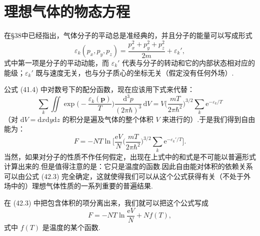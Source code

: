 \section{理想气体的物态方程}

在§38中已经指出，气体分子的平动总是准经典的，并且分子的能量可以写成形式
\begin{equation}
  \varepsilon_k(p_x,p_y,p_z)=\frac{p_x^2+p_y^2+p_z^2}{2m}+\varepsilon_k',
\end{equation}
式中第一项是分子的平动动能，而 $\varepsilon_k'$ 代表与分子的转动和它的内部状态相对应的能级；$\varepsilon_k'$ 既与速度无关，也与分子质心的坐标无关（假定没有任何外场）.

公式 (41.4) 中对数号下的配分函数，现在应该用下式来代替：
\begin{equation}
  \sum_k\iint\exp\Big(-\frac{\varepsilon_k(\boldsymbol{p})}{T}\Big)
  \frac{\mathrm{d}^3p}{(2\pi\hbar)^3}\,\mathrm{d}V
  =V\Big(\frac{mT}{2\pi\hbar^2}\Big)^{3/2}\sum_k\mathrm{e}^{-\varepsilon_k/T}
\end{equation}
（对 $\mathrm{d}V=\mathrm{d}x\mathrm{d}y\mathrm{d}z$ 的积分是遍及气体的整个体积 $V$ 来进行的）.于是我们得到自由能为：
\begin{equation}
  F=-NT\ln\Big[\frac{\mathrm{e}V}{N}\Big(\frac{mT}{2\pi\hbar^2}\Big)^{3/2}
  \sum_k\mathrm{e}^{-\varepsilon_k'/T}\Big].
\end{equation}
当然，如果对分子的性质不作任何假定，出现在上式中的和式是不可能以普遍形式计算出来的.但是值得注意的是：它只是温度的函数.因此自由能对体积的依赖关系可以由公式 (42.3) 完全确定，这就使得我们可以从这个公式获得有关（不处于外场中的）理想气体性质的一系列重要的普遍结果.

在 (42.3) 中把包含体积的项分离出来，我们就可以把这个公式写成
\begin{equation}
  F=-NT\ln\frac{\mathrm{e}V}{N}+Nf(T),
\end{equation}
式中 $f(T)$ 是温度的某个函数.

